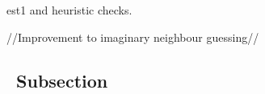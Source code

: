 est1 and heuristic checks.


//Improvement to imaginary neighbour guessing//


\subsection{\thesubsection~Subsection}

